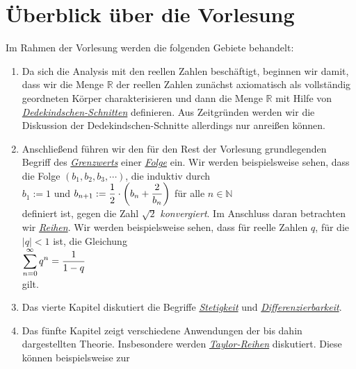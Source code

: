 \section{\"Uberblick \"uber die Vorlesung}
Im Rahmen der Vorlesung werden die folgenden Gebiete behandelt:
\begin{enumerate}
\item Da sich die Analysis mit den reellen Zahlen besch\"aftigt, beginnen wir damit, dass wir die
      Menge $\mathbb{R}$ der reellen Zahlen zun\"achst axiomatisch als vollst\"andig geordneten K\"orper
      charakterisieren und dann die Menge $\mathbb{R}$ mit Hilfe von   
      \href{http://de.wikipedia.org/wiki/Dedekindscher_Schnitt}{\emph{Dedekindschen-Schnitten}}
      definieren.  Aus Zeitgr\"unden werden wir die Diskussion der Dedekindschen-Schnitte allerdings
      nur anrei\ss{}en k\"onnen.
\item Anschlie\ss{}end f\"uhren wir den f\"ur den Rest der Vorlesung grundlegenden Begriff des 
      \href{http://de.wikipedia.org/wiki/Grenzwert_(Folge)}{\emph{Grenzwerts}} einer
      \href{http://de.wikipedia.org/wiki/Folge_(Mathematik)}{\emph{Folge}} ein. 
      Wir werden beispielsweise sehen, dass die Folge $(b_1,b_2, b_3, \cdots)$, die induktiv durch
      \\[0.2cm]
      \hspace*{1.3cm}
      $b_1 := 1$ \quad und \quad $\displaystyle b_{n+1} := \frac{1}{2} \cdot \left(b_n + \frac{2}{b_n}\right)$ f\"ur alle $n \in \mathbb{N}$
      \\[0.2cm]
      definiert ist, gegen die Zahl $\sqrt{2}$ \emph{konvergiert}.  Im Anschluss daran betrachten
      wir \href{https://de.wikipedia.org/wiki/Reihe_(Mathematik)}{\emph{Reihen}}.  Wir werden
      beispielsweise sehen, dass f\"ur reelle Zahlen $q$, f\"ur die $|q| < 1$ ist, die Gleichung
      \\[0.2cm]
      \hspace*{1.3cm}
      $\displaystyle\sum\limits_{n=0}^{\infty} q^n = \frac{1}{1 - q}$
      \\[0.2cm]
      gilt.
\item Das vierte Kapitel diskutiert die Begriffe 
      \href{http://de.wikipedia.org/wiki/Stetigkeit}{\emph{Stetigkeit}} und 
      \href{http://de.wikipedia.org/wiki/Differenzierbarkeit}{\emph{Differenzierbarkeit}}.
\item Das f\"unfte Kapitel zeigt verschiedene Anwendungen der bis dahin dargestellten Theorie.
      Insbesondere werden 
      \href{http://de.wikipedia.org/wiki/Taylorreihe}{\emph{Taylor-Reihen}} diskutiert. Diese k\"onnen beispielsweise zur

\end{enumerate}
